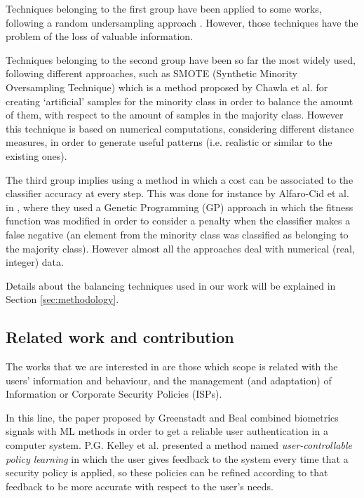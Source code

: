 \documentclass{llncs}
\begin{document}
Techniques belonging to the first group have been applied to some works, following a random undersampling approach \cite{random_undersampling_08}. However, those techniques have the problem of the loss of valuable information. 

Techniques belonging to the second  group have been so far the most widely used, following different approaches, such as SMOTE (Synthetic Minority Oversampling Technique) \cite{smote_02} which is a method proposed by Chawla et al. for creating `artificial' samples for the minority class in order to balance the amount of them, with respect to the amount of samples in the majority class. However this technique is based on numerical computations, considering  different distance measures, in order to generate useful patterns  (i.e. realistic or similar to the existing ones).

The third group implies using a method in which a cost can be associated to the classifier accuracy at every step. This was done for instance by Alfaro-Cid et al. in \cite{cost_adjustment_07}, where they used a Genetic Programming (GP) approach in which the fitness function was modified in order to consider a penalty when the classifier makes a false negative (an element from the minority class was classified as belonging to the majority class).
However almost all the approaches deal with numerical (real, integer)
data. %

Details about the balancing techniques used in our work will be explained in Section \ref{sec:methodology}. 

%
\subsection{Related work and contribution}
\label{subsec:relatedworks}

The works that we are interested in are those which scope is related with the users' information and behaviour, and the management (and adaptation) of Information or Corporate Security Policies (ISPs).

In this line, the paper proposed by Greenstadt and Beal \cite{cognitive_security_08} combined biometrics signals with ML methods in order to get a reliable user authentication in a computer system. P.G. Kelley et al. \cite{user-controllable_learning_08} presented a method named \textit{user-controllable policy learning} in which the user gives feedback to the system every time that a security policy is applied, so these policies can be refined according to that feedback to be more accurate with respect to the user's needs. 
\end{document}
